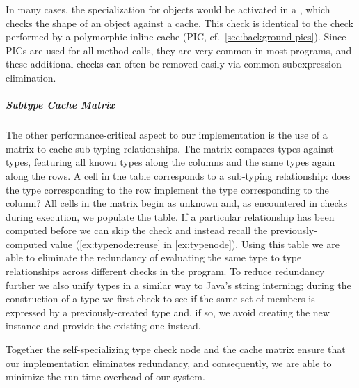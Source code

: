 In many cases, the specialization for objects would be activated in a ,
which checks the shape of an object against a cache.
This check is identical to the check performed by a polymorphic inline cache (PIC, cf.\ \cref{sec:background-pics}).
Since PICs are used for all method calls,
they are very common in most programs,
and these additional checks can often be removed
easily via common subexpression elimination.


\subparagraph{Subtype Cache Matrix}
The other performance-critical aspect to our implementation
is the use of a matrix to cache sub-typing relationships.
The matrix compares types against types,
featuring all known types along the columns and the same types again along the rows.
A cell in the table corresponds to a sub-typing relationship:
does the type corresponding to the row implement
the type corresponding to the column?
All cells in the matrix begin as unknown and, as
encountered in checks during execution, we populate the table.
If a particular relationship has been computed before
we can skip the check and instead recall the previously-computed value
(\cref{ex:typenode:reuse} in \cref{ex:typenode}).
Using this table we are able to eliminate the redundancy of evaluating
the same type to type relationships across different checks in the program. To reduce redundancy further we also unify types in a similar way to Java's string interning; 
during the construction of a type we first check to see if the same
set of members is expressed by a previously-created type and, if so,
we avoid creating the new instance and provide the existing one instead.


Together the self-specializing type check node and the cache matrix 
ensure that our implementation eliminates redundancy, and
consequently, we are able to minimize the run-time overhead of our system. 
